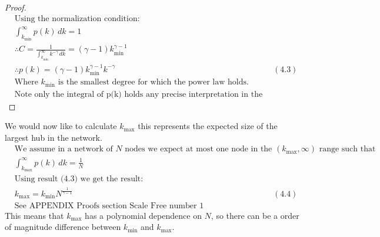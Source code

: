 \documentclass{article}
\begin{document}
\begin{proof}
\begin{align*}
                    &\text{Using the normalization condition:}\\
                    &\int_{k_{\text{min}}}^{\infty}p(k) \,dk = 1\\
                    &\therefore C = \frac{1}{\int_{k_{\text{min}}}^{\infty}k^{-\gamma} \,dk} = (\gamma -1)k_{\text{min}}^{\gamma-1}\\
                    &\therefore p(k) = (\gamma -1)k_{\text{min}}^{\gamma-1}k^{-\gamma}  &(4.3)\\
                    &\text{Where $k_{\text{min}}$ is the smallest degree for which the power law holds.}\\
                    &\text{Note only the integral of p(k) holds any precise interpretation in the continuum formalism}
                \end{align*}
            \end{proof}
            We would now like to calculate $k_{\text{max}}$ this represents the expected size of the largest hub in the network.
            \begin{align*}
                &\text{We assume in a network of $N$ nodes we expect at most one node in the $(k_{\text{max}},\infty)$ range such that}\\
                &\int_{k_{\text{max}}}^{\infty}p(k) \,dk = \frac{1}{N}\\
                &\text{Using result (4.3) we get the result:}\\
                &k_{\text{max}} = k_{\text{min}}N^{\frac{1}{\gamma -1}} &(4.4)\\
                &\text{See APPENDIX Proofs section Scale Free number 1 }
            \end{align*}
            This means that $k_{\text{max}}$ has a polynomial dependence on $N$, so there can be a order of magnitude difference between $k_{\text{min}}$ and $k_{\text{max}}$.\\
\end{document}
